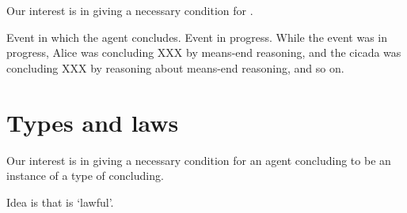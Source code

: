\begin{note}
  Our interest is in giving a necessary condition for \tC{}.

  Event in which the agent concludes.
  Event in progress.
  While the event was in progress, Alice was concluding XXX by means-end reasoning, and the cicada was concluding XXX by reasoning about means-end reasoning, and so on.
\end{note}

\section{Types and laws}
\label{cha:typical:laws}

\begin{note}
  Our interest is in giving a necessary condition for an agent concluding to be an instance of a type of concluding.

  Idea is that \tC{} is `lawful'.
\end{note}

